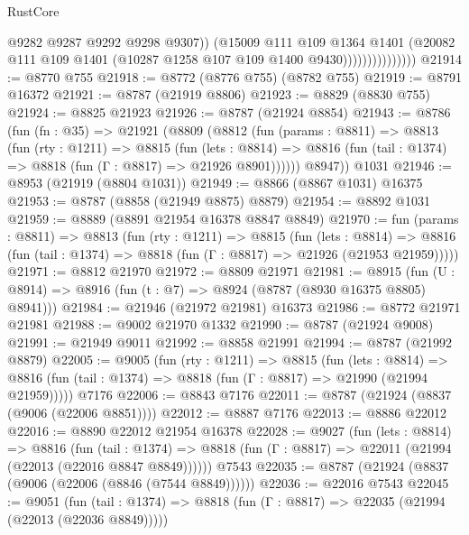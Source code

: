\begin{lexlean}{RustCore}
\begin{coremodule}
                                @9282
                                @9287
                                @9292
                                @9298
                                @9307))
                            (@15009
                              @111
                              @109
                              @1364
                              @1401
                              (@20082
                                @111
                                @109
                                @1401
                                (@10287 @1258 @107 @109 @1400 @9430)))))))))))))))
@21914 := @8770 @755
@21918 := @8772 (@8776 @755) (@8782 @755)
@21919 := @8791 @16372
@21921 := @8787 (@21919 @8806)
@21923 := @8829 (@8830 @755)
@21924 := @8825 @21923
@21926 := @8787 (@21924 @8854)
@21943 := @8786
    (fun (fn : @35) =>
    @21921
      (@8809
        (@8812
          (fun (params : @8811) =>
          @8813
            (fun (rty : @1211) =>
            @8815
              (fun (lets : @8814) =>
              @8816 (fun (tail : @1374) => @8818 (fun (Γ : @8817) => @21926 @8901))))))
        @8947))
    @1031
@21946 := @8953 (@21919 (@8804 @1031))
@21949 := @8866 (@8867 @1031) @16375
@21953 := @8787 (@8858 (@21949 @8875) @8879)
@21954 := @8892 @1031
@21959 := @8889 (@8891 @21954 @16378 @8847 @8849)
@21970 := fun (params : @8811) =>
  @8813
    (fun (rty : @1211) =>
    @8815
      (fun (lets : @8814) =>
      @8816 (fun (tail : @1374) => @8818 (fun (Γ : @8817) => @21926 (@21953 @21959)))))
@21971 := @8812 @21970
@21972 := @8809 @21971
@21981 := @8915
    (fun (U : @8914) => @8916 (fun (t : @7) => @8924 (@8787 (@8930 @16375 @8805) @8941)))
@21984 := @21946 (@21972 @21981) @16373
@21986 := @8772 @21971 @21981
@21988 := @9002 @21970 @1332
@21990 := @8787 (@21924 @9008)
@21991 := @21949 @9011
@21992 := @8858 @21991
@21994 := @8787 (@21992 @8879)
@22005 := @9005
    (fun (rty : @1211) =>
    @8815
      (fun (lets : @8814) =>
      @8816 (fun (tail : @1374) => @8818 (fun (Γ : @8817) => @21990 (@21994 @21959)))))
    @7176
@22006 := @8843 @7176
@22011 := @8787 (@21924 (@8837 (@9006 (@22006 @8851))))
@22012 := @8887 @7176
@22013 := @8886 @22012
@22016 := @8890 @22012 @21954 @16378
@22028 := @9027
    (fun (lets : @8814) =>
    @8816
      (fun (tail : @1374) =>
      @8818 (fun (Γ : @8817) => @22011 (@21994 (@22013 (@22016 @8847 @8849))))))
    @7543
@22035 := @8787 (@21924 (@8837 (@9006 (@22006 (@8846 (@7544 @8849))))))
@22036 := @22016 @7543
@22045 := @9051
    (fun (tail : @1374) => @8818 (fun (Γ : @8817) => @22035 (@21994 (@22013 (@22036 @8849)))))

\end{coremodule}
\end{lexlean}
